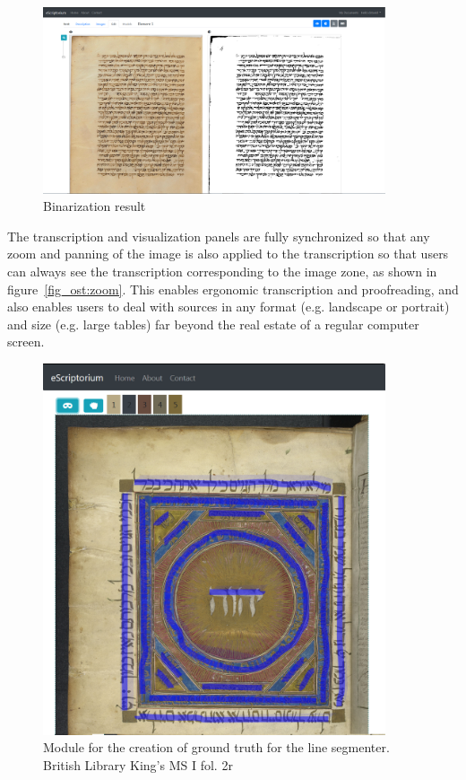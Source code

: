 \begin{figure}[h]
	\centering
	\includegraphics[width=0.9\textwidth]{binarization_example.png}
	\caption{Binarization result}
\end{figure}

The transcription and visualization panels are fully synchronized so that any
zoom and panning of the image is also applied to the transcription so that
users can always see the transcription corresponding to the image zone, as
shown in figure~\ref{fig_ost:zoom}. This enables ergonomic transcription and
proofreading, and also enables users to deal with sources in any format (e.g.
landscape or portrait) and size (e.g. large tables) far beyond the real estate
of a regular computer screen.

\begin{figure}[h]
	\centering
	\includegraphics[width=0.9\textwidth]{spanish.png}
	\caption{Module for the creation of ground truth for the line segmenter. British Library King’s MS I fol. 2r}
	\label{fig_ost:baseline}
\end{figure}

